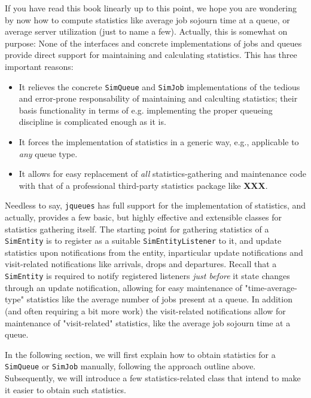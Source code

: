 \documentclass[12pt]{book}
\begin{document}
If you have read this book linearly up to this point,
  we hope you are wondering by now how to compute
  statistics like average job sojourn time at a queue,
  or average server utilization (just to name a few).
Actually, this is somewhat on purpose: None of the
  interfaces and concrete implementations
  of jobs and queues
  provide direct support for maintaining and calculating statistics.
This has three important reasons:
\begin{itemize}
\item It relieves the concrete \lstinline|SimQueue|
        and \lstinline|SimJob| implementations of the
        tedious and error-prone responsability of
        maintaining and calculting statistics;
        their basis functionality in terms of
        e.g. implementing the proper queueing discipline is
        complicated enough as it is.
\item It forces the implementation of statistics in a generic way,
      e.g., applicable to {\em any\/} queue type.
\item It allows for easy replacement of {\em all\/} statistics-gathering
        and maintenance code with that of a professional
        third-party statistics package like {\bf XXX}.
\end{itemize}

Needless to say, \lstinline|jqueues| has full support for the implementation of
  statistics, and actually, provides a few basic, but highly effective and extensible
  classes for statistics gathering itself.
The starting point for gathering statistics of a \lstinline|SimEntity|
  is to register as a suitable \lstinline|SimEntityListener| to it,
  and update statistics upon notifications from the entity,
  inparticular update notifications and
  visit-related notifications like arrivals, drops and departures.
Recall that a \lstinline|SimEntity| is required to notify registered listeners
  {\em just before\/} it state changes through an update notification,
  allowing for easy maintenance of "time-average-type" statistics
  like the average number of jobs present at a queue.
In addition (and often requiring a bit more work) the visit-related notifications
  allow for maintenance of "visit-related" statistics,
  like the average job sojourn time at a queue.

In the following section, we will first explain how to obtain statistics
  for a \lstinline|SimQueue| or \lstinline|SimJob| manually,
  following the approach outline above.
Subsequently,
  we will introduce a few statistics-related class
  that intend to make it easier to
  obtain such statistics.
\end{document}
